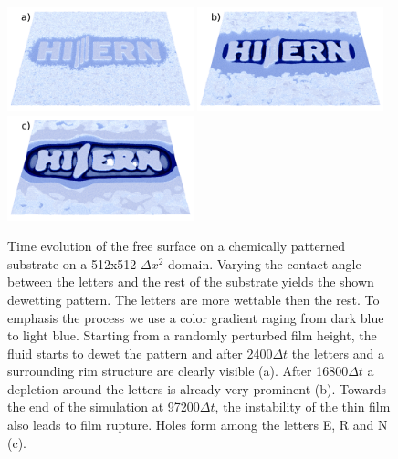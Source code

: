 \begin{figure}
    \centering
    \includegraphics[width=0.48\textwidth]{graphics/Fig_8_1_logo_v2_a).png}
    \includegraphics[width=0.48\textwidth]{graphics/Fig_8_2_logo_v2_b).png}
    \includegraphics[width=0.48\textwidth]{graphics/Fig_8_3_logo_v2_c).png}
  \caption{Time evolution of the free surface on a chemically patterned substrate on a 512x512 $\Delta x^2$ domain. 
  Varying the contact angle between the letters and the rest of the substrate yields the shown dewetting pattern. 
  The letters are more wettable then the rest. 
  To emphasis the process we use a color gradient raging from dark blue to light blue.
  Starting from a randomly perturbed film height, the fluid starts to dewet the pattern and after 2400$\Delta t$ the letters and a surrounding rim structure are clearly visible (a). 
  After 16800$\Delta t$ a depletion around the letters is already very prominent (b). 
  Towards the end of the simulation at 97200$\Delta t$, the instability of the thin film also leads to film rupture. 
  Holes form among the letters E, R and N (c).  
  }
  \label{fig:Logo_evolution}
\end{figure}

